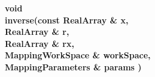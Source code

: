 \begin{flushleft} \textbf{%
void  \\ 
\settowidth{\ApproximateGlobalInverseIncludeArgIndent}{inverse(}%
inverse(const RealArray \& x, \\ 
\hspace{\ApproximateGlobalInverseIncludeArgIndent}RealArray \& r, \\ 
\hspace{\ApproximateGlobalInverseIncludeArgIndent}RealArray \& rx,\\ 
\hspace{\ApproximateGlobalInverseIncludeArgIndent}MappingWorkSpace \& workSpace, \\ 
\hspace{\ApproximateGlobalInverseIncludeArgIndent}MappingParameters \& params )
}\end{flushleft}
